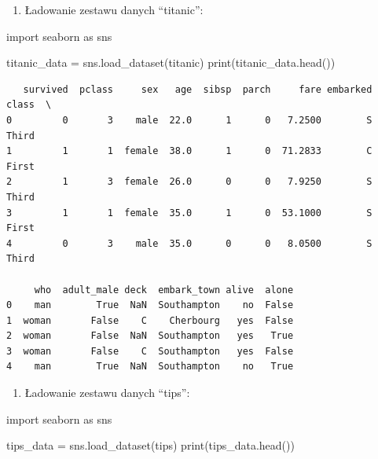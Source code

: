 \documentclass[
  polish,
  letterpaper,
  DIV=11,
  numbers=noendperiod]{scrreprt}
\newenvironment{Shaded}{\begin{snugshade}}{\end{snugshade}}
\newcommand{\BuiltInTok}[1]{\textcolor[rgb]{0.00,0.23,0.31}{#1}}
\newcommand{\ImportTok}[1]{\textcolor[rgb]{0.00,0.46,0.62}{#1}}
\newcommand{\NormalTok}[1]{\textcolor[rgb]{0.00,0.23,0.31}{#1}}
\newcommand{\OperatorTok}[1]{\textcolor[rgb]{0.37,0.37,0.37}{#1}}
\newcommand{\StringTok}[1]{\textcolor[rgb]{0.13,0.47,0.30}{#1}}
\providecommand{\tightlist}{%
  \setlength{\itemsep}{0pt}\setlength{\parskip}{0pt}}
\begin{document}
\begin{enumerate}
\def\labelenumi{\arabic{enumi}.}
\setcounter{enumi}{1}
\tightlist
\item
  Ładowanie zestawu danych ``titanic'':
\end{enumerate}

\begin{Shaded}
\begin{Highlighting}[]
\ImportTok{import}\NormalTok{ seaborn }\ImportTok{as}\NormalTok{ sns}

\NormalTok{titanic\_data }\OperatorTok{=}\NormalTok{ sns.load\_dataset(}\StringTok{\textquotesingle{}titanic\textquotesingle{}}\NormalTok{)}
\BuiltInTok{print}\NormalTok{(titanic\_data.head())}
\end{Highlighting}
\end{Shaded}

\begin{verbatim}
   survived  pclass     sex   age  sibsp  parch     fare embarked  class  \
0         0       3    male  22.0      1      0   7.2500        S  Third   
1         1       1  female  38.0      1      0  71.2833        C  First   
2         1       3  female  26.0      0      0   7.9250        S  Third   
3         1       1  female  35.0      1      0  53.1000        S  First   
4         0       3    male  35.0      0      0   8.0500        S  Third   

     who  adult_male deck  embark_town alive  alone  
0    man        True  NaN  Southampton    no  False  
1  woman       False    C    Cherbourg   yes  False  
2  woman       False  NaN  Southampton   yes   True  
3  woman       False    C  Southampton   yes  False  
4    man        True  NaN  Southampton    no   True  
\end{verbatim}

\begin{enumerate}
\def\labelenumi{\arabic{enumi}.}
\setcounter{enumi}{2}
\tightlist
\item
  Ładowanie zestawu danych ``tips'':
\end{enumerate}

\begin{Shaded}
\begin{Highlighting}[]
\ImportTok{import}\NormalTok{ seaborn }\ImportTok{as}\NormalTok{ sns}

\NormalTok{tips\_data }\OperatorTok{=}\NormalTok{ sns.load\_dataset(}\StringTok{\textquotesingle{}tips\textquotesingle{}}\NormalTok{)}
\BuiltInTok{print}\NormalTok{(tips\_data.head())}
\end{Highlighting}
\end{Shaded}
\end{document}
